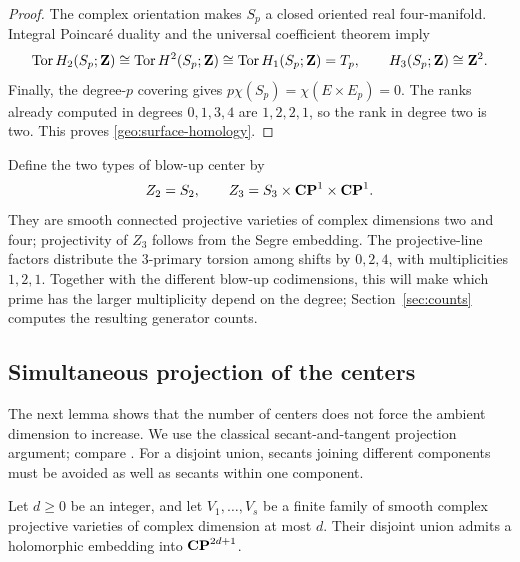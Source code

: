 \begin{proof}
The complex orientation makes $S_p$ a closed oriented real
four-manifold. Integral Poincar\'e duality and the universal coefficient
theorem imply
\[
 \operatorname{Tor} H_2(S_p;\mathbf Z)\cong\operatorname{Tor} H^2(S_p;\mathbf Z)
       \cong\operatorname{Tor} H_1(S_p;\mathbf Z)=T_p,
 \qquad H_3(S_p;\mathbf Z)\cong\mathbf Z^2.
\]
Finally, the degree-$p$ covering gives
$p\chi(S_p)=\chi(E\times E_p)=0$. The ranks already computed in degrees
$0,1,3,4$ are $1,2,2,1$, so the rank in degree two is two. This proves
\eqref{geo:surface-homology}.
\end{proof}

Define the two types of blow-up center by
\begin{equation}
\label{geo:centers}
 Z_2=S_2,\qquad Z_3=S_3\times\mathbf{CP}^1\times\mathbf{CP}^1.
\end{equation}
They are smooth connected projective varieties of complex dimensions
two and four; projectivity of $Z_3$ follows from the Segre embedding.
The projective-line factors distribute the $3$-primary torsion among
shifts by $0,2,4$, with multiplicities $1,2,1$. Together with the
different blow-up codimensions, this will make which prime has the larger
multiplicity depend on the degree; Section~\ref{sec:counts}
computes the resulting generator counts.

\subsection{Simultaneous projection of the centers}

The next lemma shows that the number of centers does not force the
ambient dimension to increase. We use the classical secant-and-tangent
projection argument; compare \cite[Chapter~IV, Exercise~3.11(a)]{Hartshorne1977}.
For a disjoint union, secants joining different components must be
avoided as well as secants within one component.

\begin{lemma}
\label{geo:projection}
Let $d\geq0$ be an integer, and let $V_1,\ldots,V_s$ be a finite family
of smooth complex projective varieties of complex dimension at most
$d$. Their disjoint union admits a holomorphic embedding into
$\mathbf{CP}^{2d+1}$.
\end{lemma}

